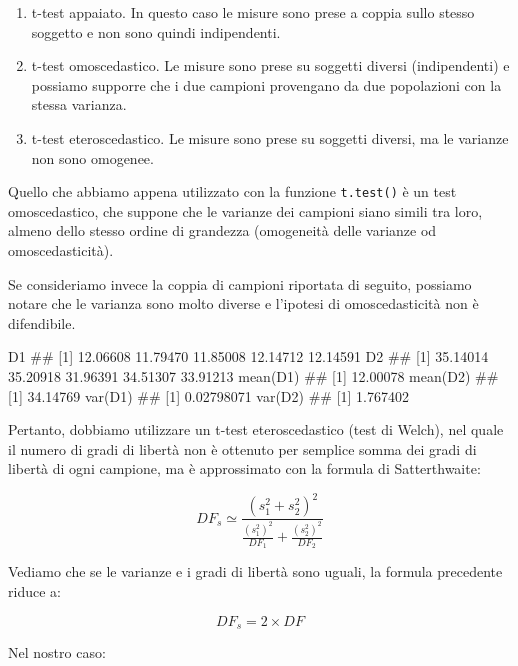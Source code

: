 \documentclass[a4paper,12pt,oneside]{book}
\providecommand{\tightlist}{%
  \setlength{\itemsep}{0pt}\setlength{\parskip}{0pt}}
\newenvironment{Shaded}{\begin{snugshade}}{\end{snugshade}}
\newcommand{\DocumentationTok}[1]{#1}
\newcommand{\FunctionTok}[1]{#1}
\newcommand{\NormalTok}[1]{#1}
\begin{document}
\begin{enumerate}
\def\labelenumi{\arabic{enumi}.}
\tightlist
\item
  t-test appaiato. In questo caso le misure sono prese a coppia sullo stesso soggetto e non sono quindi indipendenti.
\item
  t-test omoscedastico. Le misure sono prese su soggetti diversi (indipendenti) e possiamo supporre che i due campioni provengano da due popolazioni con la stessa varianza.
\item
  t-test eteroscedastico. Le misure sono prese su soggetti diversi, ma le varianze non sono omogenee.
\end{enumerate}

Quello che abbiamo appena utilizzato con la funzione \texttt{t.test()} è un test omoscedastico, che suppone che le varianze dei campioni siano simili tra loro, almeno dello stesso ordine di grandezza (omogeneità delle varianze od omoscedasticità).

Se consideriamo invece la coppia di campioni riportata di seguito, possiamo notare che le varianza sono molto diverse e l'ipotesi di omoscedasticità non è difendibile.

\begin{Shaded}
\begin{Highlighting}[]
\NormalTok{D1}
\DocumentationTok{\#\# [1] 12.06608 11.79470 11.85008 12.14712 12.14591}
\NormalTok{D2}
\DocumentationTok{\#\# [1] 35.14014 35.20918 31.96391 34.51307 33.91213}
\FunctionTok{mean}\NormalTok{(D1)}
\DocumentationTok{\#\# [1] 12.00078}
\FunctionTok{mean}\NormalTok{(D2)}
\DocumentationTok{\#\# [1] 34.14769}
\FunctionTok{var}\NormalTok{(D1)}
\DocumentationTok{\#\# [1] 0.02798071}
\FunctionTok{var}\NormalTok{(D2)}
\DocumentationTok{\#\# [1] 1.767402}
\end{Highlighting}
\end{Shaded}

Pertanto, dobbiamo utilizzare un t-test eteroscedastico (test di Welch), nel quale il numero di gradi di libertà non è ottenuto per semplice somma dei gradi di libertà di ogni campione, ma è approssimato con la formula di Satterthwaite:

\[DF_s \simeq \frac{ \left( s^2_1 + s^2_2 \right)^2 }{ \frac{(s^2_1)^2}{DF_1} + \frac{(s^2_2)^2}{DF_2} }\]

Vediamo che se le varianze e i gradi di libertà sono uguali, la formula precedente riduce a:

\[DF_s = 2 \times DF\]

Nel nostro caso:
\end{document}
